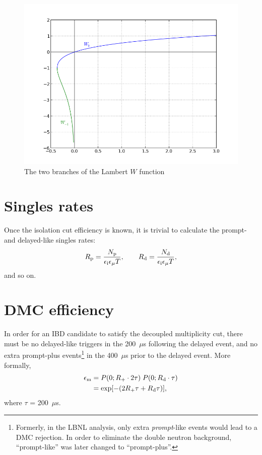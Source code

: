 \documentclass[../thesis.tex]{subfiles}
\begin{document}
\begin{figure}
  \centering \includegraphics[scale=0.7]{../images/lambertW.png}
  \caption{The two branches of the Lambert $W$ function}
  \label{fig:lambertW}
\end{figure}

\section{Singles rates}
\label{sec:singratescalc}

Once the isolation cut efficiency is known, it is trivial to calculate the
prompt- and delayed-like singles rates:
\begin{equation}
  R_\mathrm{p} = \frac{N_\mathrm{p}}{\epsilon_\mathrm{i} \epsilon_\mathrm{\mu} T},\qquad
  R_\mathrm{d} = \frac{N_\mathrm{d}}{\epsilon_\mathrm{i} \epsilon_\mathrm{\mu} T},
\end{equation}
and so on.

\section{DMC efficiency}
\label{sec:dmceffcalc}

\def\edmc{\ensuremath{\epsilon_\mathrm{m}}}

In order for an IBD candidate to satisfy the decoupled multiplicity cut, there
must be no delayed-like triggers in the 200~$\mu$s following the delayed event,
and no extra prompt-plus events\footnote{Formerly, in the LBNL analysis, only
  extra \emph{prompt}-like events would lead to a DMC rejection. In order to
  eliminate the double neutron background, ``prompt-like'' was later changed to
  ``prompt-plus''.} in the 400~$\mu$s prior to the delayed event. More formally,
\begin{align}
  \edmc &= P(0; \Rplu \cdot 2\tau)\;P(0; \Rdel \cdot \tau) \nonumber \\
        &= \exp [-(2\Rplu\tau + \Rdel\tau)],
\end{align}
where $\tau$ = 200~$\mu$s.
\end{document}
